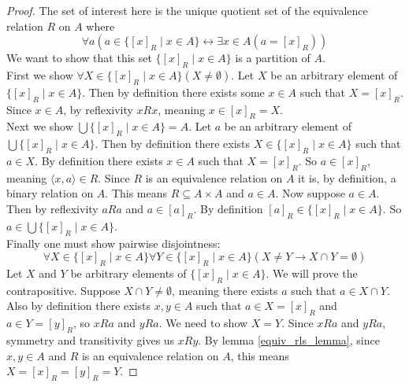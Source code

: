 \documentclass{report}
\begin{document}
\begin{proof}
The set of interest here is the unique quotient set of the equivalence relation $R$ on $A$ where
\begin{equation*}
\forall a(a\in\{[x]_R\mid x\in A\}\leftrightarrow\exists x\in A(a=[x]_R))
\end{equation*}
We want to show that this set $\{[x]_R\mid x\in A\}$ is a partition of $A$.\\
\indent First we show $\forall X\in\{[x]_R\mid x\in A\}(X\neq\emptyset)$. Let $X$ be an arbitrary element of $\{[x]_R\mid x\in A\}$. Then by definition there exists some $x\in A$ such that 
$X=[x]_R$. Since $x\in A$, by reflexivity $xRx$, meaning $x\in[x]_R=X$.\\
\indent Next we show $\bigcup\{[x]_R\mid x\in A\}=A$. Let $a$ be an arbitrary element of $\bigcup\{[x]_R\mid x\in A\}$. Then by definition there exists $X\in\{[x]_R\mid x\in A\}$ such that
$a\in X$. By definition there exists $x\in A$ such that $X=[x]_R$. So $a\in[x]_R$, meaning $\langle x,a\rangle\in R$. Since $R$ is an equivalence relation on $A$ it is, 
by definition, a binary relation on $A$. This means $R\subseteq A\times A$ and $a\in A$.
Now suppose $a\in A$. Then by reflexivity $aRa$ and $a\in[a]_R$. By definition $[a]_R\in\{[x]_R\mid x\in A\}$. So $a\in\bigcup\{[x]_R\mid x\in A\}$.\\
\indent Finally one must show pairwise disjointness:
\begin{equation*}
\forall X\in\{[x]_R\mid x\in A\}\forall Y\in\{[x]_R\mid x\in A\}(X\neq Y\to X\cap Y=\emptyset)
\end{equation*}
Let $X$ and $Y$ be arbitrary elements of $\{[x]_R\mid x\in A\}$. We will prove the contrapositive. Suppose $X\cap Y\neq\emptyset$, meaning there exists $a$ such that $a\in X\cap Y$. 
Also by definition there exists $x,y\in A$ such that $a\in X=[x]_R$ and $a\in Y=[y]_R$, so $xRa$ and $yRa$.
We need to show $X=Y$. Since $xRa$ and $yRa$, symmetry and transitivity gives us $xRy$. By lemma \ref{equiv_rls_lemma}, since $x,y\in A$ and $R$ is an equivalence relation on $A$, this means
$X=[x]_R=[y]_R=Y$.
\end{proof}
\newpage
\end{document}
